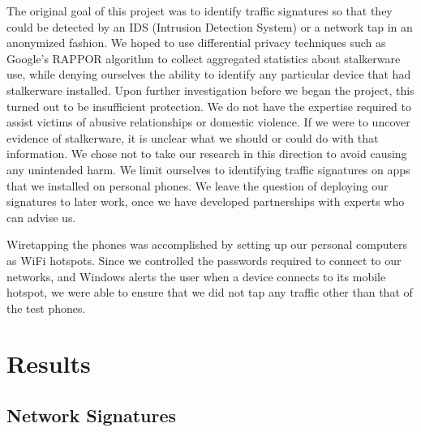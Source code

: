 \documentclass[acmtog]{acmart}
\begin{document}
The original goal of this project was to identify traffic signatures so that 
they could be detected by an IDS (Intrusion Detection System) or a network 
tap in an anonymized fashion. We hoped to use differential privacy techniques 
such as Google's RAPPOR algorithm \cite{erlingsson_rappor:_2014} to collect 
aggregated statistics about stalkerware use, while denying ourselves the 
ability to identify any particular device that had stalkerware installed. Upon 
further investigation before we began the project, this turned out to be 
insufficient protection. We do not have the expertise required to assist 
victims of abusive 
relationships or domestic violence. If we were to uncover evidence of 
stalkerware, it is unclear what we should or could do with that information. We 
chose not to take our research in this 
direction to avoid causing any unintended harm. We limit ourselves to 
identifying traffic signatures on apps that we installed on personal phones. We 
leave the question of deploying our signatures to later work, once we have 
developed partnerships with experts who can advise us.

Wiretapping the phones was accomplished by setting up our personal computers as 
WiFi hotspots. Since we controlled the passwords required to connect to our 
networks, and Windows alerts the user when a device connects to its mobile 
hotspot, we were able to ensure that we did not tap any traffic other than that 
of the test phones. 
\section{Results}

\subsection{Network Signatures}
\label{network_signatures}
\end{document}
